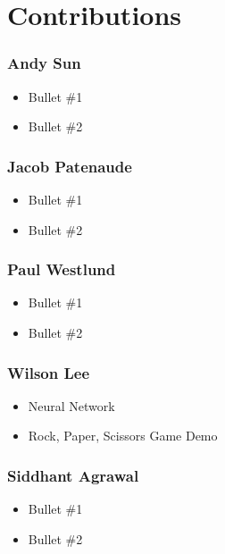 \section{Contributions}

\subsubsection*{Andy Sun}
\begin{itemize}
\item Bullet \#1
\item Bullet \#2
\end{itemize}

\subsubsection*{Jacob Patenaude}
\begin{itemize}
\item Bullet \#1
\item Bullet \#2
\end{itemize}

\subsubsection*{Paul Westlund}
\begin{itemize}
\item Bullet \#1
\item Bullet \#2
\end{itemize}

\subsubsection*{Wilson Lee}
\begin{itemize}
\item Neural Network
\item Rock, Paper, Scissors Game Demo
\end{itemize}

\subsubsection*{Siddhant Agrawal}
\begin{itemize}
\item Bullet \#1
\item Bullet \#2
\end{itemize}
